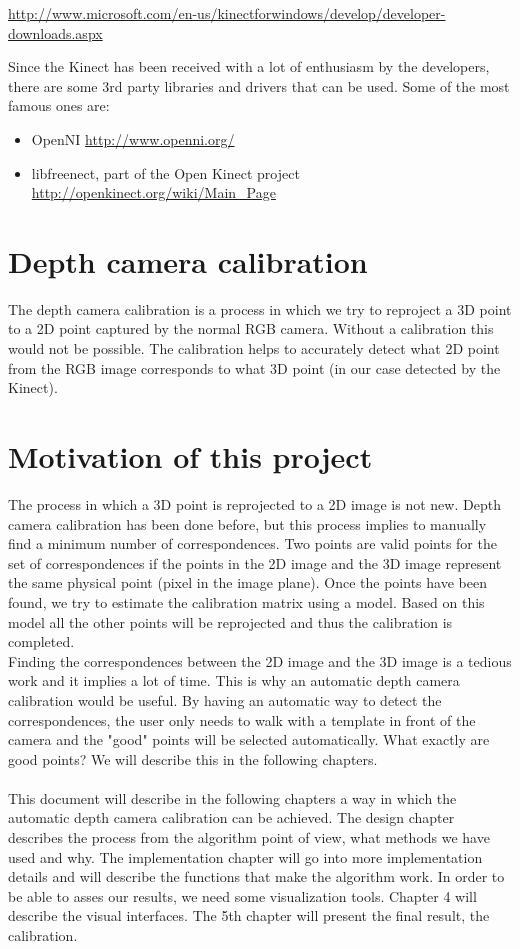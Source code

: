 \url{http://www.microsoft.com/en-us/kinectforwindows/develop/developer-downloads.aspx}

\noindent
Since the Kinect has been received with a lot of enthusiasm by the developers, there are some 3rd party libraries and drivers that can be used. Some of the most famous ones are:
\begin{itemize}
	\item OpenNI \url{http://www.openni.org/}
	\item libfreenect, part of the Open Kinect project \url{http://openkinect.org/wiki/Main_Page}
\end{itemize}

\section{Depth camera calibration}
\noindent
The depth camera calibration is a process in which we try to reproject a 3D point to a 2D point captured by the normal RGB camera. Without a calibration this would not be possible. The calibration helps to accurately detect what 2D point from the RGB image corresponds to what 3D point (in our case detected by the Kinect).

\section{Motivation of this project}
\noindent
The process in which a 3D point is reprojected to a 2D image is not new. Depth camera calibration has been done before, but this process implies to manually find a minimum number of correspondences. Two points are valid points for the set of correspondences if the points in the 2D image and the 3D image represent the same physical point (pixel in the image plane). Once the points have been found, we try to estimate the calibration matrix using a model. Based on this model all the other points will be reprojected and thus the calibration is completed.  
\\
\noindent
Finding the correspondences between the 2D image and the 3D image is a tedious work and it implies a lot of time. This is why an automatic depth camera calibration would be useful. By having an automatic way to detect the correspondences, the user only needs to walk with a template in front of the camera and the "good" points will be selected automatically. What exactly are good points? We will describe this in the following chapters. 
\\\\
\noindent
This document will describe in the following chapters a way in which the automatic depth camera calibration can be achieved. The design chapter describes the process from the algorithm point of view, what methods we have used and why. The implementation chapter will go into more implementation details and will describe the functions that make the algorithm work. In order to be able to asses our results, we need some visualization tools. Chapter 4 will describe the visual interfaces. The 5th chapter will present the final result, the calibration.    
